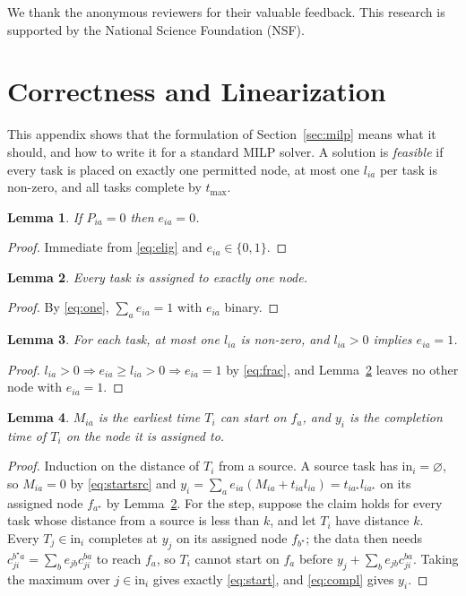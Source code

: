\documentclass[conference]{IEEEtran}
\newtheorem{lemma}{Lemma}
\begin{document}
We thank the anonymous reviewers for their valuable feedback. This research is supported by the National Science Foundation (NSF).

\appendix
\section{Correctness and Linearization}
\label{app:proofs}

This appendix shows that the formulation of Section~\ref{sec:milp} means what it should, and how to write it for a standard MILP solver. A solution is \emph{feasible} if every task is placed on exactly one permitted node, at most one $l_{ia}$ per task is non-zero, and all tasks complete by $t_{\max}$.

\begin{lemma}
\label{lem:elig}
If $P_{ia}=0$ then $e_{ia}=0$.
\end{lemma}
\begin{proof}
Immediate from \eqref{eq:elig} and $e_{ia}\in\{0,1\}$.
\end{proof}

\begin{lemma}
\label{lem:one}
Every task is assigned to exactly one node.
\end{lemma}
\begin{proof}
By \eqref{eq:one}, $\sum_a e_{ia}=1$ with $e_{ia}$ binary.
\end{proof}

\begin{lemma}
\label{lem:frac}
For each task, at most one $l_{ia}$ is non-zero, and $l_{ia}>0$ implies $e_{ia}=1$.
\end{lemma}
\begin{proof}
$l_{ia}>0\Rightarrow e_{ia}\ge l_{ia}>0\Rightarrow e_{ia}=1$ by \eqref{eq:frac}, and Lemma~\ref{lem:one} leaves no other node with $e_{ia}=1$.
\end{proof}

\begin{lemma}
\label{lem:timing}
$M_{ia}$ is the earliest time $T_i$ can start on $f_a$, and $y_i$ is the completion time of $T_i$ on the node it is assigned to.
\end{lemma}
\begin{proof}
Induction on the distance of $T_i$ from a source. A source task has $\mathrm{in}_i=\varnothing$, so $M_{ia}=0$ by \eqref{eq:startsrc} and $y_i=\sum_a e_{ia}(M_{ia}+t_{ia}l_{ia})=t_{ia^{\star}}l_{ia^{\star}}$ on its assigned node $f_{a^{\star}}$ by Lemma~\ref{lem:one}. For the step, suppose the claim holds for every task whose distance from a source is less than $k$, and let $T_i$ have distance $k$. Every $T_j\in\mathrm{in}_i$ completes at $y_j$ on its assigned node $f_{b^{\star}}$; the data then needs $c_{ji}^{b^{\star}a}=\sum_b e_{jb}c_{ji}^{ba}$ to reach $f_a$, so $T_i$ cannot start on $f_a$ before $y_j+\sum_b e_{jb}c_{ji}^{ba}$. Taking the maximum over $j\in\mathrm{in}_i$ gives exactly \eqref{eq:start}, and \eqref{eq:compl} gives $y_i$.
\end{proof}
\end{document}
